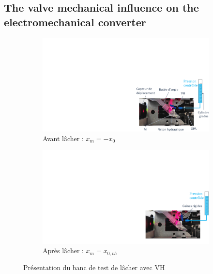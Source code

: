 \documentclass[3p,twocolumn,preprint]{elsarticle}
\def \hfillx {\hspace*{ -\linewidth} \hfill} %
\begin{document}
	\subsection{The valve mechanical influence on the electromechanical converter}	
	\label{The mechanical influence of the valve on the electromechanical converter}
\begin{figure}[!htbp]
\begin{center}
	\begin{subfigure}[b]{0.49\textwidth}
	\captionsetup{justification=centering} 
	\includegraphics[trim={19cm 0cm 0cm 8cm},clip,width=\textwidth]{figures/presentation_BDT_avant_actionnement.pdf}
	\caption{Avant lâcher : $x_m=-x_0$}
	\label{fig:presentation_BDT_lacher_avant_actionnement}
	\end{subfigure}
\hfillx
	\begin{subfigure}[b]{0.49\textwidth}
	\captionsetup{justification=centering} 
	\includegraphics[trim={19cm 0cm 0cm 8cm},clip,width=\textwidth]{figures/presentation_BDT_apres_actionnement.pdf}
	\caption{Après lâcher : $x_m=x_{0,vh}$}
	\label{fig:presentation_BDT_lacher_apres_actionnement}
	\end{subfigure}
	\caption{Présentation du banc de test de lâcher avec VH}
	\label{fig:presentation_BDT_lacher_tube}
\end{center}	
\end{figure} 
\end{document}
